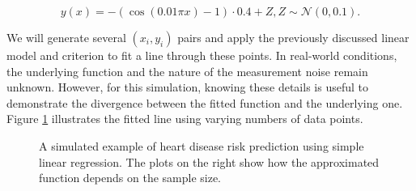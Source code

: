 \begin{equation}
	y(x) = -(\cos(0.01 \pi x) - 1) \cdot 0.4 + Z, Z \sim \mathcal{N}(0, 0.1).
\end{equation}

We will generate several $(x_i, y_i)$ pairs and apply the previously discussed linear model and criterion to fit a line through these points. In real-world conditions, the underlying function and the nature of the measurement noise remain unknown. However, for this simulation, knowing these details is useful to demonstrate the divergence between the fitted function and the underlying one. Figure \ref{fig:t1-t2-example} illustrates the fitted line using varying numbers of data points.

\begin{figure}[h!]
 \hfill
 \hfill
 \hfill
 \caption{A simulated example of heart disease risk prediction using simple linear regression. The plots on the right show how the approximated function depends on the sample size.\label{fig:t1-t2-example}}
\end{figure}

